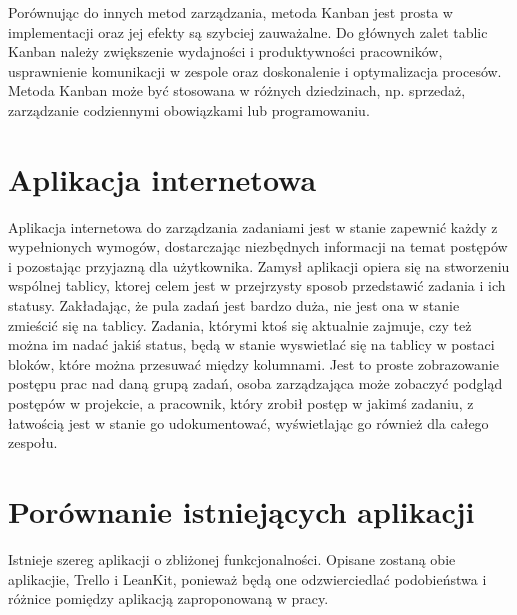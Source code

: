 Porównując do innych metod zarządzania, metoda Kanban jest prosta w implementacji oraz jej efekty są szybciej zauważalne.  Do głównych zalet tablic Kanban należy zwiększenie wydajności i produktywności pracowników, usprawnienie komunikacji w zespole oraz doskonalenie i optymalizacja procesów. Metoda Kanban może być stosowana w różnych dziedzinach, np. sprzedaż, zarządzanie codziennymi obowiązkami lub programowaniu.


\section{Aplikacja internetowa}

Aplikacja internetowa do zarządzania zadaniami jest w stanie zapewnić każdy z wypełnionych wymogów, dostarczając niezbędnych informacji na temat postępów i pozostając przyjazną dla użytkownika. Zamysł aplikacji opiera się na stworzeniu wspólnej tablicy, ktorej celem jest w przejrzysty sposob przedstawić zadania i ich statusy. Zakładając, że pula zadań jest bardzo duża, nie jest ona w stanie zmieścić się na tablicy. Zadania, którymi ktoś się aktualnie zajmuje, czy też można im nadać jakiś status, będą w stanie wyswietlać się na tablicy w postaci bloków, które można przesuwać między kolumnami. Jest to proste zobrazowanie postępu prac nad daną grupą zadań, osoba zarządzająca może zobaczyć podgląd postępów w projekcie, a pracownik, który zrobił postęp w jakimś zadaniu, z łatwością jest w stanie go udokumentować, wyświetlając go również dla całego zespołu.

\section{Porównanie istniejących aplikacji}
\indent Istnieje szereg aplikacji o zbliżonej funkcjonalności. Opisane zostaną obie aplikacjie, Trello i LeanKit, ponieważ będą one odzwierciedlać  podobieństwa i różnice pomiędzy aplikacją zaproponowaną w pracy. 


